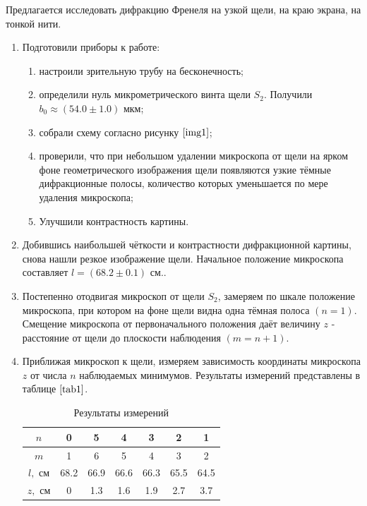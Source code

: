 \documentclass[a4paper,12pt]{article} %
\begin{document}
Предлагается исследовать дифракцию Френеля на узкой щели, на краю экрана, на тонкой нити.

\begin{enumerate}
    \item Подготовили приборы к работе:
    \begin{enumerate}
        \item настроили зрительную трубу на бесконечность;
        \item определили нуль микрометрического винта щели $S_2$. Получили $b_0\approx (54.0 \pm 1.0) \text{ мкм}$;
        \item собрали схему согласно рисунку $\ref{img1}$;
        \item проверили, что при небольшом удалении микроскопа от щели на ярком фоне геометрического изображения щели появляются узкие тёмные дифракционные полосы, количество которых уменьшается по мере удаления микроскопа;
        \item Улучшили контрастность картины.
    \end{enumerate}
    \item Добившись наибольшей чёткости и контрастности дифракционной картины, снова нашли резкое изображение щели. Начальное положение микроскопа составляет $l = (68.2\pm0.1)\text{ см}.$.
    \item Постепенно отодвигая микроскоп от щели $S_2$, замеряем по шкале положение микроскопа, при котором на фоне щели видна одна тёмная полоса $(n=1)$. Смещение микроскопа от первоначального положения даёт величину $z$ - расстояние от щели до плоскости наблюдения $(m=n+1)$.
    \item Приближая микроскоп к щели, измеряем зависимость координаты микроскопа $z$ от числа $n$ наблюдаемых минимумов. Результаты измерений представлены в таблице $\ref{tab1}$.

    \begin{table}[h]
        \centering
        \begin{tabular}{|c|c|c|c|c|c|c|}
        \hline
            $n$ & 0 & 5 & 4 & 3 & 2 & 1 \\ \hline
            $m$ & 1 & 6 & 5 & 4 & 3 & 2 \\ \hline
    	$l, \text{ см}$ & 68.2 & 66.9 & 66.6 & 66.3 & 65.5 & 64.5 \\ \hline
    	$z, \text{ см}$ & 0 & 1.3 & 1.6 & 1.9 & 2.7 & 3.7 \\ \hline
        \end{tabular}
    \caption{Результаты измерений}
    \label{tab1}
    \end{table}
    

\end{enumerate}
\end{document}
